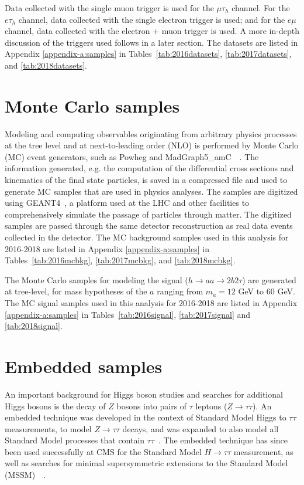 Data collected with the single muon trigger is used for the $\mu\tau_{h}$ channel. For the $e\tau_{h}$ channel, data collected with the single electron trigger is used; and for the $e\mu$ channel, data collected with the electron $+$ muon trigger is used. A more in-depth discussion of the triggers used follows in a later section. The datasets are listed in Appendix \ref{appendix-a:samples} in Tables~\ref{tab:2016datasets}, \ref{tab:2017datasets}, and \ref{tab:2018datasets}.

\section{Monte Carlo samples}
\label{section:mc-samples}
Modeling and computing observables originating from arbitrary physics processes at the tree level and at next-to-leading order (NLO) is performed by Monte Carlo (MC) event generators, such as Powheg and MadGraph5\_amC\@NLO~\cite{Alwall_2014}~\cite{Frederix_2018}. The information generated, e.g. the computation of the differential cross sections and kinematics of the final state particles, is saved in a compressed file and used to generate MC samples that are used in physics analyses. The samples are digitized using GEANT4~\cite{agostinelli_geant4simulation_2003}, a platform used at the LHC and other facilities to comprehensively simulate the passage of particles through matter. The digitized samples are passed through the same detector reconstruction as real data events collected in the detector. The MC background samples used in this analysis for 2016-2018 are listed in Appendix \ref{appendix-a:samples} in Tables~\ref{tab:2016mcbkg}, \ref{tab:2017mcbkg}, and \ref{tab:2018mcbkg}.

The Monte Carlo samples for modeling the signal ($h \rightarrow aa \rightarrow 2b2\tau$) are generated at tree-level, for mass hypotheses of the $a$ ranging from $m_a = 12$ GeV to 60 GeV. The MC signal samples used in this analysis for 2016-2018 are listed in Appendix \ref{appendix-a:samples} in Tables~\ref{tab:2016signal}, \ref{tab:2017signal} and \ref{tab:2018signal}. 


\section{Embedded samples}
\label{section:embedded-samples}
An important background for Higgs boson studies and searches for additional Higgs bosons is the decay of $Z$ bosons into pairs of $\tau$ leptons ($Z \rightarrow \tau\tau$). An embedded technique was developed in the context of Standard Model Higgs to $\tau\tau$ measurements, to model $Z \rightarrow \tau\tau$ decays, and was expanded to also model all Standard Model processes that contain $\tau\tau$~\cite{CMS-TAU-18-001}. The embedded technique has since been used successfully at CMS for the Standard Model $H \rightarrow \tau\tau$ measurement, as well as searches for minimal supersymmetric extensions to the Standard Model (MSSM)~\cite{CMS-HIG-13-021}~\cite{CMS-HIG-19-010}. 

